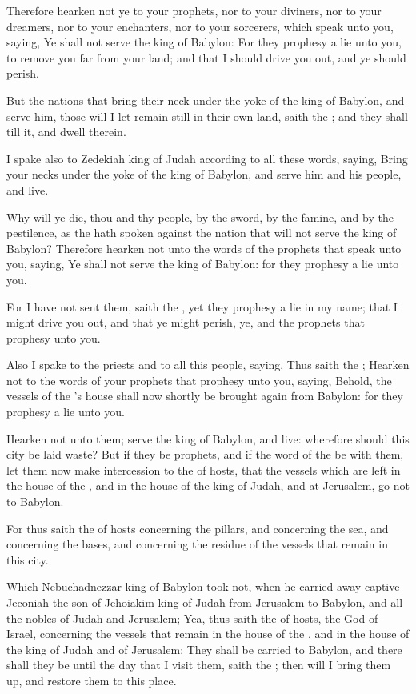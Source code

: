 \verse Therefore hearken not ye to your prophets, nor to your diviners, nor to your dreamers, nor to your enchanters, nor to your sorcerers, which speak unto you, saying, Ye shall not serve the king of Babylon: \verse For they prophesy a lie unto you, to remove you far from your land; and that I should drive you out, and ye should perish.

\verse But the nations that bring their neck under the yoke of the king of Babylon, and serve him, those will I let remain still in their own land, saith the \LORD; and they shall till it, and dwell therein.

\verse I spake also to Zedekiah king of Judah according to all these words, saying, Bring your necks under the yoke of the king of Babylon, and serve him and his people, and live.

\verse Why will ye die, thou and thy people, by the sword, by the famine, and by the pestilence, as the \LORD hath spoken against the nation that will not serve the king of Babylon?  \verse Therefore hearken not unto the words of the prophets that speak unto you, saying, Ye shall not serve the king of Babylon: for they prophesy a lie unto you.

\verse For I have not sent them, saith the \LORD, yet they prophesy a lie in my name; that I might drive you out, and that ye might perish, ye, and the prophets that prophesy unto you.

\verse Also I spake to the priests and to all this people, saying, Thus saith the \LORD; Hearken not to the words of your prophets that prophesy unto you, saying, Behold, the vessels of the \LORD's house shall now shortly be brought again from Babylon: for they prophesy a lie unto you.

\verse Hearken not unto them; serve the king of Babylon, and live: wherefore should this city be laid waste?  \verse But if they be prophets, and if the word of the \LORD be with them, let them now make intercession to the \LORD of hosts, that the vessels which are left in the house of the \LORD, and in the house of the king of Judah, and at Jerusalem, go not to Babylon.

\verse For thus saith the \LORD of hosts concerning the pillars, and concerning the sea, and concerning the bases, and concerning the residue of the vessels that remain in this city.

\verse Which Nebuchadnezzar king of Babylon took not, when he carried away captive Jeconiah the son of Jehoiakim king of Judah from Jerusalem to Babylon, and all the nobles of Judah and Jerusalem; \verse Yea, thus saith the \LORD of hosts, the God of Israel, concerning the vessels that remain in the house of the \LORD, and in the house of the king of Judah and of Jerusalem; \verse They shall be carried to Babylon, and there shall they be until the day that I visit them, saith the \LORD; then will I bring them up, and restore them to this place.


